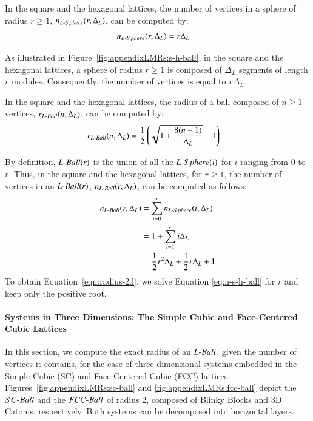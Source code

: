 \begin{lem}
	In the square and the hexagonal lattices, the number of vertices in a sphere of radius $r \geq 1$, $n_{\mathop{L{\textnormal{-}Sphere}}}(r,\Delta_L)$, can be computed by:
	\begin{align}
	\label{eq:n-s-h-sphere}
	n_{\mathop{L{\textnormal{-}Sphere}}}(r,\Delta_L) & =  r\Delta_L
	\end{align}
\end{lem}

\begin{pf}
	As illustrated in Figure~\ref{fig:appendixLMRs:s-h-ball}, in the square and the hexagonal lattices, a sphere of radius $r \geq 1$ is composed of $\Delta_L$ segments of length $r$ modules. Consequently, the number of vertices is equal to $r \Delta_L$.
\end{pf}

\begin{thm}
	In the square and the hexagonal lattices, the radius of a ball composed of $n \geq 1$ vertices, $r_{\mathop{L{\textnormal{-}Ball}}}(n,\Delta_L)$, can be computed by:
	\begin{align}
	\label{eqn:radius-2d}
	r_{\mathop{L{\textnormal{-}Ball}}}(n,\Delta_L) & = \frac{1}{2} \left( \sqrt{1+\frac{8(n-1)}{\Delta_L}} - 1 \right)
	\end{align}
\end{thm}

\begin{pf}
	By definition, $\mathop{L{\textnormal{-}Ball}}(r)$ is the union of all the $\mathop{L{\textnormal{-}Sphere}}(i)$ for $i$ ranging from $0$ to $r$. Thus, in the square and the hexagonal lattices, for $r \geq 1$, the number of vertices in an $\mathop{L{\textnormal{-}Ball}}(r)$, $n_{\mathop{L{\textnormal{-}Ball}}}(r,\Delta_L)$, can be computed as follows:
	\begin{align}
	n_{\mathop{L{\textnormal{-}Ball}}}(r,\Delta_L) & = \sum_{i=0}^{r} n_{\mathop{L{\textnormal{-}Sphere}}}(i, \Delta_L) \\
	& =  1 + \sum_{i=1}^{r} i \Delta_L \\ 
	& = \frac{1}{2} {r}^2 \Delta_L + \frac{1}{2} r \Delta_L + 1
	\label{eq:n-s-h-ball}
	\end{align}
	To obtain Equation~\ref{eqn:radius-2d}, we solve Equation \eqref{eq:n-s-h-ball} for $r$ and keep only the positive root.
\end{pf}

\paragraph{Systems in Three Dimensions: The Simple Cubic and Face-Centered Cubic Lattices}

In this section, we compute the exact radius of an $\mathop{L{\textnormal{-}Ball}}$, given the number of vertices it contains, for the case of three-dimensional systems embedded in the Simple Cubic (SC) and Face-Centered Cubic (FCC) lattices. Figures~\ref{fig:appendixLMRs:sc-ball} and \ref{fig:appendixLMRs:fcc-ball} depict the $\mathop{SC{\textnormal{-}Ball}}$ and the $\mathop{FCC{\textnormal{-}Ball}}$ of radius 2, composed of Blinky Blocks and 3D Catoms, respectively. Both systems can be decomposed into horizontal layers.

